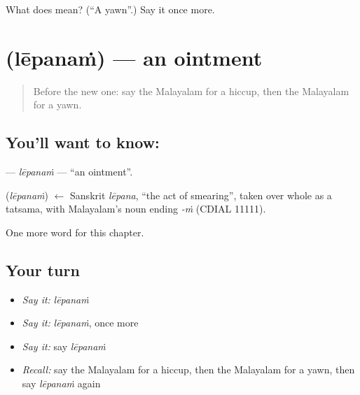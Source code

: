 \begin{tcolorbox}[breakable,colback=teal!4,colframe=teal!35!black,title={Before you move on}]
What does  mean? (\textquotedblleft{}A yawn\textquotedblright{}.) Say it once more.
\end{tcolorbox}
\section[\texorpdfstring{\ml{ലേപനം} (lēpanaṁ)}{ലേപനം (lēpanaṁ)}]{ (lēpanaṁ) — an ointment}

\label{lesson:ML-C313-lepanam}



\begin{quote}
Before the new one: say the Malayalam for a hiccup, then the Malayalam for a yawn.
\end{quote}

\subsection*{You'll want to know: }
\textbf{} — \emph{lēpanaṁ} — \textquotedblleft{}an ointment\textquotedblright{}.

\begin{cousinweb}
\textbf{} (\emph{lēpanaṁ}) $\leftarrow$ Sanskrit \emph{lēpana}, \textquotedblleft{}the act of smearing\textquotedblright{}, taken over whole as a tatsama, with Malayalam's noun ending \emph{-ṁ} (CDIAL 11111).
\end{cousinweb}

\begin{grammarlens}[title={What you've built}]
One more word for this chapter.
\end{grammarlens}

\subsection*{Your turn}
\begin{itemize}
\raggedright
  \item \emph{Say it:} \emph{lēpanaṁ}
  \item \emph{Say it:} \emph{lēpanaṁ}, once more
  \item \emph{Say it:} say \emph{lēpanaṁ}
  \item \emph{Recall:} say the Malayalam for a hiccup, then the Malayalam for a yawn, then say \emph{lēpanaṁ} again
\end{itemize}

